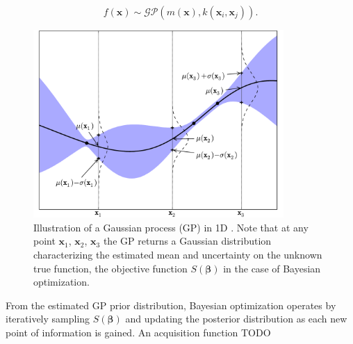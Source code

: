 \begin{equation}\label{eq:additional:unsupervised:BO:GP}
f\left(\bm{x}\right) \sim \mathcal{GP}\left(m\left(\bm{x}\right), k\left(\bm{x}_{i}, \bm{x}_{j}\right)\right).
\end{equation}

\begin{figure}
\centering
\includegraphics[width=0.85\textwidth]{figures/ml/gp.pdf}
\caption{
Illustration of a Gaussian process (GP) in 1D \cite{Brochu2010}.
Note that at any point $\bm{x}_{1}$, $\bm{x}_{2}$, $\bm{x}_{3}$ the GP
returns a Gaussian distribution characterizing the estimated mean and uncertainty on the
unknown true function, \ie the objective function $S\left(\bm{\beta}\right)$ in the case of Bayesian optimization.
}
\label{fig:additional:unsupervised:BO:GP_ex}
\end{figure}

From the estimated GP prior distribution, Bayesian optimization
operates by iteratively sampling $S\left(\bm{\beta}\right)$ and updating the posterior distribution
as each new point of information is gained.
An acquisition function TODO



